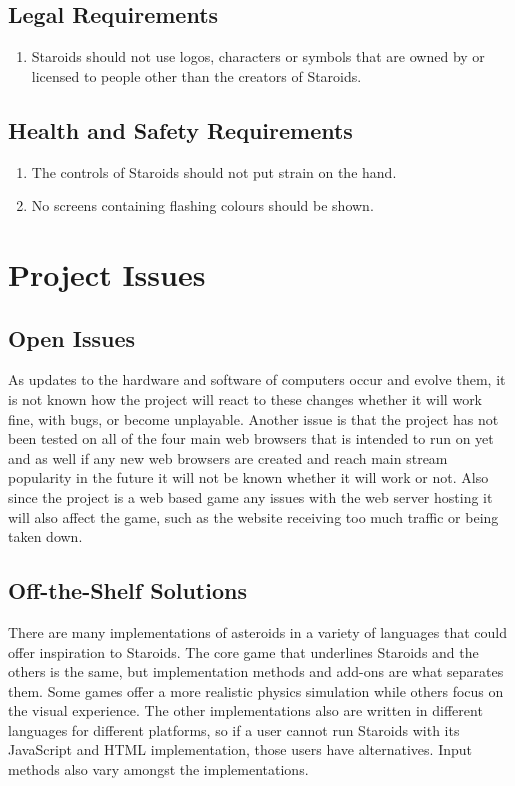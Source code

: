 \documentclass[12pt, titlepage]{article}
\begin{document}
\subsection{Legal Requirements}
  \begin{enumerate}
    \item Staroids should not use logos, characters or symbols that are owned by or licensed to people other than the creators of Staroids.
  \end{enumerate}

\subsection{Health and Safety Requirements}
  \begin{enumerate}
    \item The controls of Staroids should not put strain on the hand.
    \item No screens containing flashing colours should be shown.
  \end{enumerate}


\section{Project Issues}

\subsection{Open Issues}
As updates to the hardware and software of computers occur and evolve them, it is not known how the project will react to these changes whether it will work fine, with bugs, or become unplayable. Another issue is that the project has not been tested on all of the four main web browsers that is intended to run on yet and as well if any new web browsers are created and reach main stream popularity in the future it will not be known whether it will work or not. Also since the project is a web based game any issues with the web server hosting it will also affect the game, such as the website receiving too much traffic or being taken down.\\

\subsection{Off-the-Shelf Solutions}
There are many implementations of asteroids in a variety of languages that could offer inspiration to Staroids. The core game that underlines Staroids and the others is the same, but implementation methods and add-ons are what separates them. Some games offer a more realistic physics simulation while others focus on the visual experience. The other implementations also are written in different languages for different platforms, so if a user cannot run Staroids with its JavaScript and HTML implementation, those users have alternatives. Input methods also vary amongst the implementations.\\
\end{document}
